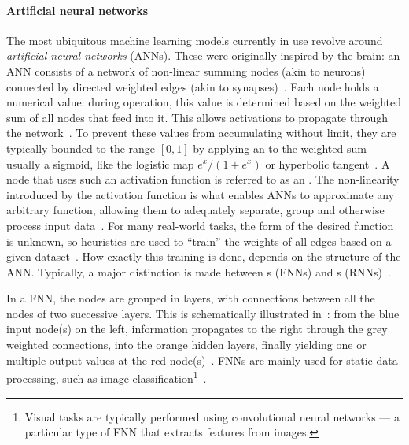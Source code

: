 \paragraph{Artificial neural networks}
The most ubiquitous machine learning models currently in use revolve around \emph{artificial neural networks} (ANNs).
These were originally inspired by the brain: an ANN consists of a network of non-linear summing nodes (akin to neurons) connected by directed weighted edges (akin to synapses)~\cite{EvaluatingRestrictedESNs,zurada1992introduction,AIsimulateMemoryContinuity}.
Each node holds a numerical value: during operation, this value is determined based on the weighted sum of all nodes that feed into it.
This allows activations to propagate through the network~\cite{lukovsevivcius2009reservoir}.
To prevent these values from accumulating without limit, they are typically bounded to the range $[0,1]$ by applying an  to the weighted sum --- usually a sigmoid, like the logistic map $e^x/(1+e^x)$ or hyperbolic tangent~\cite{SurveyUniversalApproximation}.
A node that uses such an activation function is referred to as an .
The non-linearity introduced by the activation function is what enables ANNs to approximate any arbitrary function, allowing them to adequately separate, group and otherwise process input data~\cite{ApproximationFNN,SurveyUniversalApproximation,funahashi1992neural}.
For many real-world tasks, the form of the desired function is unknown, so heuristics are used to ``train'' the weights of all edges based on a given dataset~\cite{EvaluatingRestrictedESNs}.
How exactly this training is done, depends on the structure of the ANN.
Typically, a major distinction is made between s (FNNs) and s (RNNs)~\cite{ApproximationRNN}. \par
In a FNN, the nodes are grouped in layers, with connections between all the nodes of two successive layers.
This is schematically illustrated in~: from the blue input node(s) on the left, information propagates to the right through the grey weighted connections, into the orange hidden layers, finally yielding one or multiple output values at the red node(s)~\cite{zurada1992introduction}.
FNNs are mainly used for static data processing, such as image classification\footnote{Visual tasks are typically performed using convolutional neural networks --- a particular type of FNN that extracts features from images.}~\cite{ApproximationRNN}.
